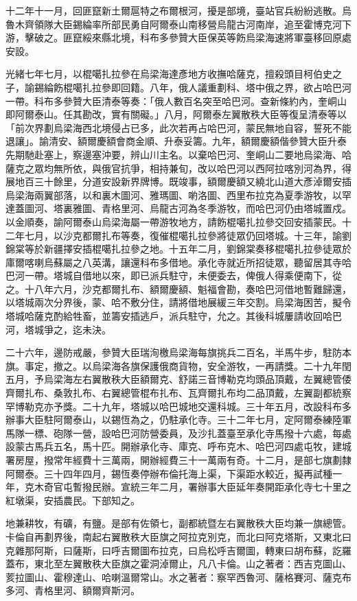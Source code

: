 \begin{pinyinscope}
十二年十一月，回匪竄新土爾扈特之布爾根河，擾是部境，臺站官兵紛紛逃散。烏魯木齊領隊大臣錫綸率所部民勇自阿爾泰山南移營烏龍古河南岸，追至霍博克河下游，擊破之。匪竄綏來縣北境，科布多參贊大臣保英等飭烏梁海速將軍臺移回原處安設。

光緒七年七月，以棍噶扎拉參在烏梁海達彥地方收撫哈薩克，擅殺頭目柯伯史之子，諭錫綸飭棍噶扎拉參即回籍。八年，俄人議重劃科、塔中俄之界，欲占哈巴河一帶。科布多參贊大臣清泰等奏：「俄人數百名突至哈巴河。查新條約內，奎峒山即阿爾泰山。任其勘改，實有關礙。」八月，阿爾泰左翼散秩大臣等復呈清泰等以「前次界劃烏梁海西北境侵占已多，此次若再占哈巴河，蒙民無地自容，誓死不能退讓」。諭清安、額爾慶額會商金順、升泰妥籌。九年，額爾慶額偕參贊大臣升泰先期馳赴塞上，察邊塞沖要，辨山川主名。以棄哈巴河、奎峒山二要地烏梁海、哈薩克之眾均無所依，與俄官抗爭，相持兼旬，改以哈巴河以西阿拉喀別河為界，得展地百三十餘里，分道安設新界牌博。既竣事，額爾慶額又繞北山道大彥淖爾安插烏梁海兩翼部落，以和裏木圖河、雅瑪圖、喲洛圖、西里布拉克為夏季游牧，以罕達蓋圖河、塔裏雅圖、青格里河、烏龍古河為冬季游牧，而哈巴河仍由塔城置戍。以金順奏，諭阿爾泰山烏梁海屬一帶游牧地方，請飭棍噶扎拉參交回安插蒙民。十二年七月，以沙克都爾扎布等奏，復催棍噶扎拉參將徒眾仍回塔城。十三年，諭劉錦棠等於新疆擇安插棍噶扎拉參之地。十五年二月，劉錦棠奏移棍噶扎拉參徒眾於庫爾喀喇烏蘇屬之八英溝，讓還科布多借地。承化寺就近所招徒眾，聽留居其寺哈巴河一帶。塔城自借地以來，即已派兵駐守，未便委去，俾俄人得乘便南下，從之。十八年六月，沙克都爾扎布、額爾慶額、魁福會勘，奏哈巴河借地暫難歸還，以塔城兩次分界後，蒙、哈不敷分住，請將借地展緩三年交割。烏梁海困苦，擬令塔城哈薩克酌給牲畜，並籌安插逃戶，派兵駐守，允之。其後科城屢請收回哈巴河，塔城爭之，迄未決。

二十六年，邊防戒嚴，參贊大臣瑞洵檄烏梁海每旗挑兵二百名，半馬牛步，駐防本旗。事定，撤之。以烏梁海各旗保護俄商貨物，安全游牧，一再請獎。二十九年閏五月，予烏梁海左右翼散秩大臣額爾克、舒諾三音博勒克均頭品頂戴，左翼總管倭齊爾扎布、桑敦扎布、右翼總管棍布扎布、瓦齊爾扎布均二品頂戴，左翼副都統察罕博勒克亦予獎。二十九年，塔城以哈巴城地交還科城。三十年五月，改設科布多辦事大臣駐阿爾泰山，以錫恆為之，仍駐承化寺。三十二年七月，定阿爾泰練陸軍馬隊一標、砲隊一營，設哈巴河防營委員，及沙扎蓋臺至承化寺馬撥十六處，每處設蒙古馬兵五名，馬十匹。開辦承化寺、庫克、呼布克木、哈巴河四處屯牧，建城署房屋，撥常年經費十三萬兩，開辦經費三十一萬兩有奇。十二月，是部七旗劃隸阿爾泰。三十四年四月，錫恆奏停辦布倫托海上渠，下渠距水較近，擬再試種一年，克木奇官屯暫撥民辦。宣統三年二月，署辦事大臣延年奏開距承化寺七十里之紅墩渠，安插農民。下部知之。

地兼耕牧，有礦，有鹽。是部有佐領七，副都統暨左右翼散秩大臣均兼一旗總管。卡倫自再劃界後，南起右翼散秩大臣旗之阿拉克別克，而北曰阿克塔斯，又東北曰克雜那阿斯，曰薩斯，曰呼吉爾圖布拉克，曰烏松呼吉爾圖，轉東曰胡布蘇，訖羅蓋布，東北至左翼散秩大臣旗之霍洞淖爾止，凡八卡倫。山之著者：西吉克圖山、荄拉圖山、霍穆達山、哈喇溫爾常山。水之著者：察罕西魯河、薩格賽河、薩克布多河、青格里河、額爾齊斯河。


\end{pinyinscope}
